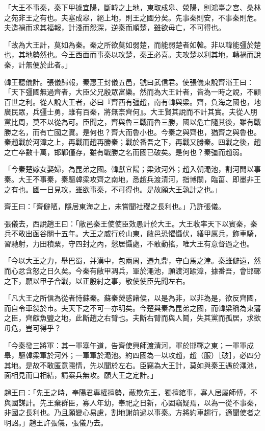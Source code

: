 \begin{pinyinscope}
「大王不事秦，秦下甲據宜陽，斷韓之上地，東取成皋、滎陽，則鴻臺之宮、桑林之苑非王之有也。夫塞成皋，絕上地，則王之國分矣。先事秦則安，不事秦則危。夫造禍而求其福報，計淺而怨深，逆秦而順楚，雖欲毋亡，不可得也。

「故為大王計，莫如為秦。秦之所欲莫如弱楚，而能弱楚者如韓。非以韓能彊於楚也，其地勢然也。今王西面而事秦以攻楚，秦王必喜。夫攻楚以利其地，轉禍而說秦，計無便於此者。」

韓王聽儀計。張儀歸報，秦惠王封儀五邑，號曰武信君。使張儀東說齊湣王曰：「天下彊國無過齊者，大臣父兄殷眾富樂。然而為大王計者，皆為一時之說，不顧百世之利。從人說大王者，必曰『齊西有彊趙，南有韓與梁。齊，負海之國也，地廣民眾，兵彊士勇，雖有百秦，將無柰齊何』。大王賢其說而不計其實。夫從人朋黨比周，莫不以從為可。臣聞之，齊與魯三戰而魯三勝，國以危亡隨其後，雖有戰勝之名，而有亡國之實。是何也？齊大而魯小也。今秦之與齊也，猶齊之與魯也。秦趙戰於河漳之上，再戰而趙再勝秦；戰於番吾之下，再戰又勝秦。四戰之後，趙之亡卒數十萬，邯鄲僅存，雖有戰勝之名而國已破矣。是何也？秦彊而趙弱。

「今秦楚嫁女娶婦，為昆弟之國。韓獻宜陽；梁效河外；趙入朝澠池，割河閒以事秦。大王不事秦，秦驅韓梁攻齊之南地，悉趙兵渡清河，指博關，臨菑、即墨非王之有也。國一日見攻，雖欲事秦，不可得也。是故願大王孰計之也。」

齊王曰：「齊僻陋，隱居東海之上，未嘗聞社稷之長利也。」乃許張儀。

張儀去，西說趙王曰：「敝邑秦王使使臣效愚計於大王。大王收率天下以賓秦，秦兵不敢出函谷關十五年。大王之威行於山東，敝邑恐懼懾伏，繕甲厲兵，飾車騎，習馳射，力田積粟，守四封之內，愁居懾處，不敢動搖，唯大王有意督過之也。

「今以大王之力，舉巴蜀，并漢中，包兩周，遷九鼎，守白馬之津。秦雖僻遠，然而心忿含怒之日久矣。今秦有敝甲凋兵，軍於澠池，願渡河踰漳，據番吾，會邯鄲之下，願以甲子合戰，以正殷紂之事，敬使使臣先聞左右。

「凡大王之所信為從者恃蘇秦。蘇秦熒惑諸侯，以是為非，以非為是，欲反齊國，而自令車裂於市。夫天下之不可一亦明矣。今楚與秦為昆弟之國，而韓梁稱為東藩之臣，齊獻魚鹽之地，此斷趙之右臂也。夫斷右臂而與人鬬，失其黨而孤居，求欲毋危，豈可得乎？

「今秦發三將軍：其一軍塞午道，告齊使興師渡清河，軍於邯鄲之東；一軍軍成皋，驅韓梁軍於河外；一軍軍於澠池。約四國為一以攻趙，趙（服）［破］，必四分其地。是故不敢匿意隱情，先以聞於左右。臣竊為大王計，莫如與秦王遇於澠池，面相見而口相結，請案兵無攻。願大王之定計。」

趙王曰：「先王之時，奉陽君專權擅勢，蔽欺先王，獨擅綰事，寡人居屬師傅，不與國謀計。先王棄群臣，寡人年幼，奉祀之日新，心固竊疑焉，以為一從不事秦，非國之長利也。乃且願變心易慮，割地謝前過以事秦。方將約車趨行，適聞使者之明詔。」趙王許張儀，張儀乃去。


\end{pinyinscope}
